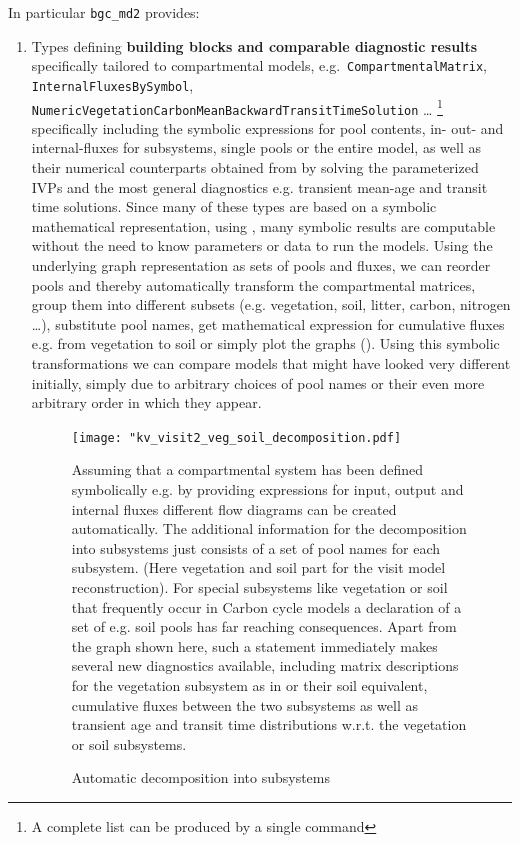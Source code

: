 In particular \texttt{bgc\_md2} provides:
  \begin{enumerate}
    \item
      Types defining {\bf building blocks and comparable diagnostic results} 
      specifically tailored to compartmental models, 
      e.g.\ \texttt{CompartmentalMatrix}, \texttt{InternalFluxesBySymbol},
      \texttt{NumericVegetationCarbonMeanBackwardTransitTimeSolution} \dots  
      \footnote{A complete list can be produced by a single command}
      specifically including the symbolic expressions for pool contents, in- out- and internal-fluxes for
      subsystems, single pools or the entire model, as well as their numerical counterparts obtained from 
      by solving the parameterized IVPs and the most general diagnostics e.g. transient mean-age and transit time solutions.
      Since many of these types are based on a symbolic
      mathematical representation, using \sympy{}, many symbolic results are computable 
      without the need to know parameters or data to run the
      models.  Using the underlying graph representation as sets
      of pools and fluxes, we can reorder pools and thereby
      automatically transform the compartmental matrices, group
      them into different subsets (e.g. vegetation, soil, litter,
      carbon, nitrogen \dots ), substitute pool names, get
      mathematical expression for cumulative fluxes e.g. from
      vegetation to soil or simply plot the graphs ().
      Using this symbolic transformations we can compare models that might
      have looked very different initially, simply due to
      arbitrary choices of pool names or their even more arbitrary
      order in which they appear. 
      \begin{figure}[h]
      \texttt{[image: "kv\_visit2\_veg\_soil\_decomposition.pdf]}
      \caption{Automatic decomposition into subsystems} 
      Assuming that a compartmental system has been defined symbolically e.g. by providing expressions for input,  output and internal fluxes different flow diagrams can be created automatically. 
      The additional information for the decomposition into subsystems just consists of a set of pool names for each subsystem.
      (Here vegetation and soil part for the visit model reconstruction).
      For special subsystems like vegetation or soil that frequently occur in Carbon cycle models a declaration of a set of e.g. soil pools has far reaching consequences. 
        Apart from the graph shown here, such a statement immediately makes
        several new diagnostics available, including matrix descriptions for
        the vegetation subsystem as in \citep{Ceballos2018Biogeosciences} or
        their soil equivalent, cumulative fluxes between the two subsystems as
        well as transient age and transit time distributions w.r.t. the
        vegetation or soil subsystems.
        

\end{figure}
\end{enumerate}
